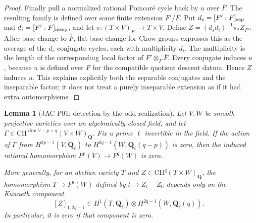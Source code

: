 \documentclass[11pt,a4paper]{article}
\newtheorem{lemma}[theorem]{Lemma}
\begin{document}
\begin{proof}
Finally pull a normalized rational Poincar\'e cycle back by $u$ over
$\overline F$.  The resulting family is defined over some finite
extension $F'/F$.  Put $d_s=[F':F]_{\rm sep}$ and
$d_i=[F':F]_{\rm insep}$, and let
$\pi:(T\times V)_{F'}\to T\times V$.
Define $Z=(d_sd_i)^{-1}\pi_*Z_{F'}$.  After base change to
$\overline F$, flat base change for Chow groups expresses this as
the average of the $d_s$ conjugate cycles, each with multiplicity
$d_i$.  The multiplicity is the length of the corresponding local
factor of $F'\otimes_F\overline F$.  Every conjugate induces $u$,
because $u$ is defined over $F$ for the compatible quotient descent
datum.  Hence $Z$ induces $u$.  This explains explicitly both the
separable conjugates and the inseparable factor; it does not treat a
purely inseparable extension as if it had extra automorphisms.
\end{proof}

\begin{lemma}[JAC-P01: detection by the odd realization]
\label{jac:P01}
Let $V,W$ be smooth projective varieties over an algebraically closed
field, and let
$\Gamma\in\mathrm{CH}^{\dim V-p+q}(V\times W)_{\mathbf Q}$.
Fix a prime $\ell$ invertible in the field.  If the action of $\Gamma$
from $H^{2p-1}(V,\mathbf Q_\ell)$ to
$H^{2q-1}(W,\mathbf Q_\ell(q-p))$ is zero, then the induced rational
homomorphism $P^p(V)\longrightarrow P^q(W)$ is zero.

More generally, for an abelian variety $T$ and
$Z\in\mathrm{CH}^q(T\times W)_{\mathbf Q}$, the homomorphism
$T\longrightarrow P^q(W)$ defined by $t\mapsto Z_t-Z_0$ depends only
on the K\"unneth component
\[
 [Z]_{1,2q-1}\in H^1(T,\mathbf Q_\ell)\otimes
 H^{2q-1}(W,\mathbf Q_\ell(q)).
\]
In particular, it is zero if that component is zero.
\end{lemma}
\end{document}

